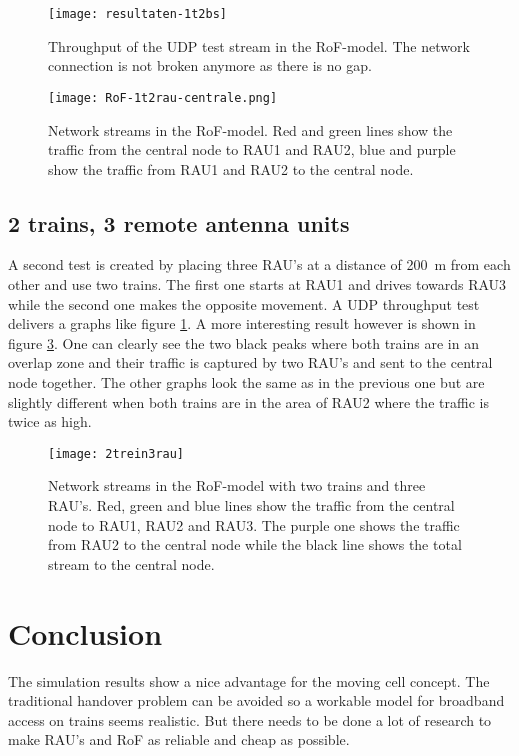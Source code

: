 \documentclass[twocolumn]{phdsymp} %
\begin{document}
\begin{figure}[ht]
\begin{center}
	\texttt{[image: resultaten-1t2bs]}
	\caption{\label{resultaten-1t2bs}Throughput of the UDP test stream in the RoF-model.  The network connection is not broken anymore as there is no gap.}
\end{center}
\end{figure}


\begin{figure}[ht]
\begin{center}
	\texttt{[image: RoF-1t2rau-centrale.png]}
	\caption{\label{RoF-1t2rau-centrale.png}Network streams in the RoF-model.  Red and green lines show the traffic from the central node to RAU1 and RAU2, blue and purple show the traffic from RAU1 and RAU2 to the central node.}
\end{center}
\end{figure}


\subsection{2 trains, 3 remote antenna units}
A second test is created by placing three RAU's at a distance of 200~m from each other and use two trains.  The first one starts at RAU1 and drives towards RAU3 while the second one makes the opposite movement.  A UDP throughput test delivers a graphs like figure \ref{resultaten-1t2bs}.  A more interesting result however is shown in figure \ref{2trein3rau}.  One can clearly see the two black peaks where both trains are in an overlap zone and their traffic is captured by two RAU's and sent to the central node together.  The other graphs look the same as in the previous one but are slightly different when both trains are in the area of RAU2 where the traffic is twice as high.

\begin{figure}[ht]
\begin{center}
	\texttt{[image: 2trein3rau]}
	\caption{\label{2trein3rau}Network streams in the RoF-model with two trains and three RAU's.  Red, green and blue lines show the traffic from the central node to RAU1, RAU2 and RAU3.  The purple one shows the traffic from RAU2 to the central node while the black line shows the total stream to the central node.}
\end{center}
\end{figure}


\section{Conclusion}
The simulation results show a nice advantage for the moving cell concept.  The traditional handover problem can be avoided so a workable model for broadband access on trains seems realistic.  But there needs to be done a lot of research to make RAU's and RoF as reliable and cheap as possible.
\end{document}
